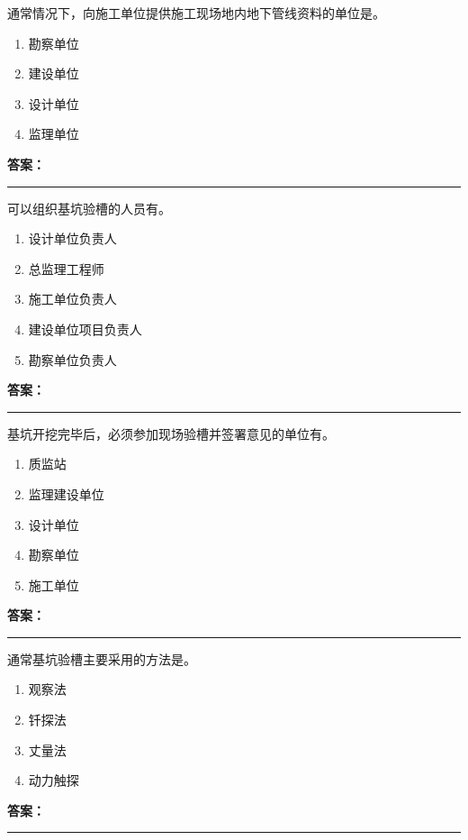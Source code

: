 \documentclass[UTF8,fontset=fandol,11pt]{ctexart}
\newcommand{\answerline}{\textcolor{answerred}{\rule{2.4cm}{0.7pt}}}
\begin{document}
\begin{quizbox}[title={第 23 题}]
通常情况下，向施工单位提供施工现场地内地下管线资料的单位是。\\
\begin{enumerate}[label=\Alph*.]
\item 勘察单位
\item 建设单位
\item 设计单位
\item 监理单位
\end{enumerate}
\textbf{\textcolor{answerred}{答案：}} \answerline
\end{quizbox}

\begin{quizbox}[title={第 24 题}]
可以组织基坑验槽的人员有。\\
\begin{enumerate}[label=\Alph*.]
\item 设计单位负责人
\item 总监理工程师
\item 施工单位负责人
\item 建设单位项目负责人
\item 勘察单位负责人
\end{enumerate}
\textbf{\textcolor{answerred}{答案：}} \answerline
\end{quizbox}

\begin{quizbox}[title={第 25 题}]
基坑开挖完毕后，必须参加现场验槽并签署意见的单位有。\\
\begin{enumerate}[label=\Alph*.]
\item 质监站
\item 监理建设单位
\item 设计单位
\item 勘察单位
\item 施工单位
\end{enumerate}
\textbf{\textcolor{answerred}{答案：}} \answerline
\end{quizbox}

\begin{quizbox}[title={第 26 题}]
通常基坑验槽主要采用的方法是。\\
\begin{enumerate}[label=\Alph*.]
\item 观察法
\item 钎探法
\item 丈量法
\item 动力触探
\end{enumerate}
\textbf{\textcolor{answerred}{答案：}} \answerline
\end{quizbox}
\end{document}
